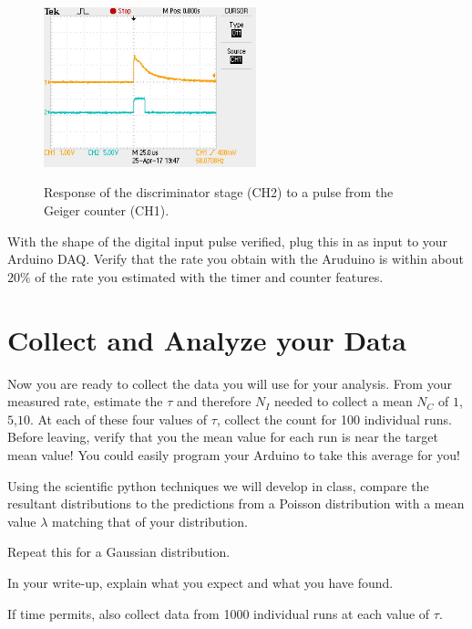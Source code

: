 \documentclass[12pt]{article}
\begin{document}
\begin{figure}[htbp]
\begin{center}
{\includegraphics[width=0.55\textwidth]{figs/geiger_digitized.jpg}}
\end{center}
\caption{\label{fig:geigerdigitized} Response of the discriminator stage (CH2) to a pulse from the Geiger counter (CH1).}
\end{figure}


With the shape of the digital input pulse verified, plug this in as input to your Arduino DAQ.  Verify that the rate you obtain with the Aruduino is within about $20\%$ of the rate you estimated with the timer and counter features.
 

\section{Collect and Analyze your Data}

Now you are ready to collect the data you will use for your analysis.  From your measured rate, estimate the $\tau$ and therefore $N_I$ needed to collect a mean $N_C$ of $1$,$5$,$10$.  At each of these four values of $\tau$, collect the count for 100 individual runs.  Before leaving, verify that you the mean value for each run is near the target mean value!  You could easily program your Arduino to take this average for you!

Using the scientific python techniques we will develop in class, compare the resultant distributions to the predictions from a Poisson distribution with a mean value $\lambda$ matching that of your distribution.

Repeat this for a Gaussian distribution.

In your write-up, explain what you expect and what you have found.

If time permits, also collect data from 1000 individual runs at each value of $\tau$.
\end{document}
